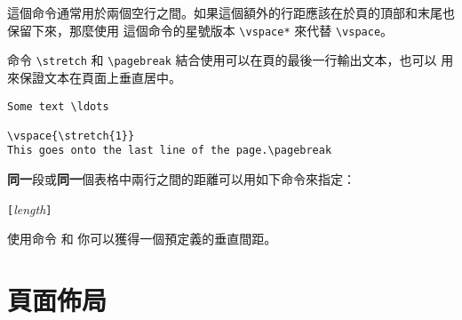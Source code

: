 這個命令通常用於兩個空行之間。如果這個額外的行距應該在於頁的頂部和末尾也保留下來，那麼使用
這個命令的星號版本 \verb|\vspace*| 來代替 \verb|\vspace|。

命令 \verb|\stretch| 和 \verb|\pagebreak| 結合使用可以在頁的最後一行輸出文本，也可以
用來保證文本在頁面上垂直居中。
\begin{code}
\begin{verbatim}
Some text \ldots

\vspace{\stretch{1}}
This goes onto the last line of the page.\pagebreak
\end{verbatim}
\end{code}

\textbf{同一}段或\textbf{同一}個表格中兩行之間的距離可以用如下命令來指定：
\begin{lscommand}
\ci{\bs}\verb|[|\emph{length}\verb|]|
\end{lscommand}

使用命令  和  你可以獲得一個預定義的垂直間距。

\section{頁面佈局}

